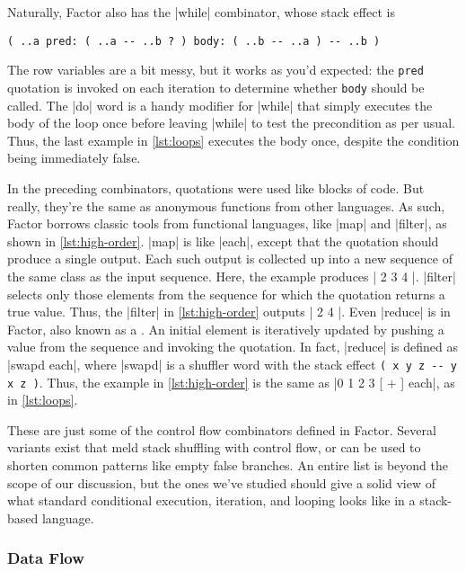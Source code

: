 Naturally, Factor also has the \factor|while| combinator, whose stack effect is
%
\begin{center}
%
  \Verb|( ..a pred: ( ..a -- ..b ? ) body: ( ..b -- ..a ) -- ..b )|
%
\end{center}
%
\noindent The row variables are a bit messy, but it works as you'd expected:
the \Verb|pred| quotation is invoked on each iteration to determine whether
\Verb|body| should be called.  The \factor|do| word is a handy modifier for
\factor|while| that simply executes the body of the loop once before leaving
\factor|while| to test the precondition as per usual.  Thus, the last example
in \vref{lst:loops} executes the body once, despite the condition being
immediately false.


In the preceding combinators, quotations were used like blocks of code.  But
really, they're the same as anonymous functions from other languages.  As such,
Factor borrows classic tools from functional languages, like \factor|map| and
\factor|filter|, as shown in \vref{lst:high-order}.  \factor|map| is like
\factor|each|, except that the quotation should produce a single output.  Each
such output is collected up into a new sequence of the same class as the input
sequence.  Here, the example produces
%
\factor|{ 2 3 4 }|.
%
\factor|filter| selects only those elements from the sequence for which the
quotation returns a true value.  Thus, the \factor|filter| in
\vref{lst:high-order} outputs
%
\factor|{ 2 4 }|.
%
Even \factor|reduce| is in Factor, also known as a .  An
initial element is iteratively updated by pushing a value from the sequence and
invoking the quotation.  In fact, \factor|reduce| is defined as
%
\factor|swapd each|,
%
where \factor|swapd| is a shuffler word with the stack effect
%
\Verb|( x y z -- y x z )|.
%
Thus, the example in \vref{lst:high-order} is the same as
%
\factor|0 { 1 2 3 } [ + ] each|,
%
as in \vref{lst:loops}.

These are just some of the control flow combinators defined in Factor.  Several
variants exist that meld stack shuffling with control flow, or can be used to
shorten common patterns like empty false branches.  An entire list is beyond
the scope of our discussion, but the ones we've studied should give a solid
view of what standard conditional execution, iteration, and looping looks like
in a stack-based language.

\subsubsection{Data Flow}\label{sec:primer:data-flow}

